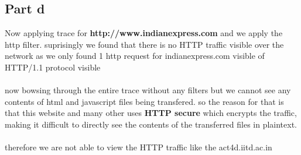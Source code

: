 \documentclass[11pt]{scrartcl}
\begin{document}
\subsection{Part d}
Now applying trace for \textbf{http://www.indianexpress.com} and we apply the http filter. suprisingly we found that there is no HTTP traffic visible over the network as we only found 1 http request for indianexpress.com visible of HTTP/1.1 protocol visible \\ \\
now bowsing through the entire trace without any filters but we cannot see any contents of html and javascript files being transfered. so the reason for that is that this website and many other uses \textbf{HTTP secure}  which encrypts the traffic, making it difficult to directly see the contents of the transferred files in plaintext. \\ \\
therefore we are not able to view the HTTP traffic like the act4d.iitd.ac.in 
\newpage

\newpage
\end{document}
